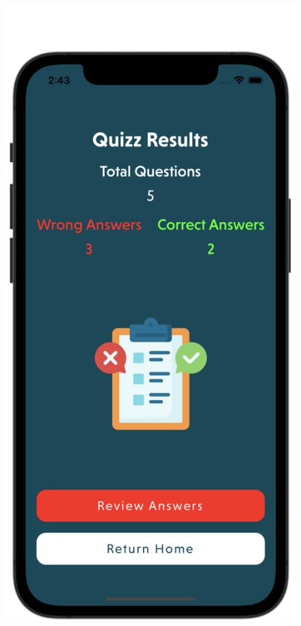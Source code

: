 \begin{figure}[H]
    \centering
    \begin{minipage}[b]{0.43\linewidth}
        \centering
        \includegraphics[width=\linewidth]{Mobile UI/Quiz Result.png}

\end{minipage}
\end{figure}
